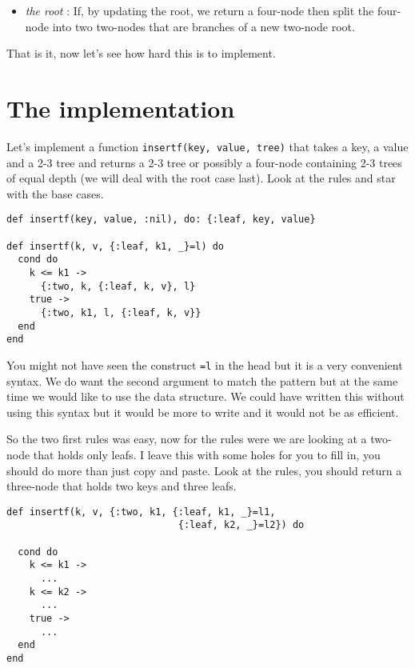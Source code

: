 \documentclass[a4paper,11pt]{article}
\begin{document}
\begin{itemize}
    \item {\em the root} : If, by updating the root, we return a four-node
    then split the four-node into two two-nodes that are branches of a
    new two-node root.
\end{itemize}

That is it, now let's see how hard this is to implement.



\section{The implementation}

Let's implement a function {\tt insertf(key, value, tree)} that takes a
key, a value and a 2-3 tree and returns a 2-3 tree or possibly a
four-node containing 2-3 trees of equal depth (we will deal with the
root case last). Look at the rules and star with the base cases.

\begin{verbatim}
def insertf(key, value, :nil), do: {:leaf, key, value}

def insertf(k, v, {:leaf, k1, _}=l) do
  cond do
    k <= k1 ->
      {:two, k, {:leaf, k, v}, l}
    true ->
      {:two, k1, l, {:leaf, k, v}}
  end
end
\end{verbatim}

You might not have seen the construct {\tt =l} in the head but it is a
very convenient syntax. We do want the second argument to match the
pattern but at the same time we would like to use the data
structure. We could have written this without using this syntax but it
would be more to write and it would not be as efficient.

So the two first rules was easy, now for the rules were we are looking
at a two-node that holds only leafs. I leave this with some holes for
you to fill in, you should do more than just copy and paste. Look at
the rules, you should return a three-node that holds two keys and
three leafs.

\begin{verbatim}
def insertf(k, v, {:two, k1, {:leaf, k1, _}=l1, 
                              {:leaf, k2, _}=l2}) do
                              
  cond do
    k <= k1 ->  
      ...
    k <= k2 -> 
      ...
    true ->
      ...
  end
end
\end{verbatim}
\end{document}
